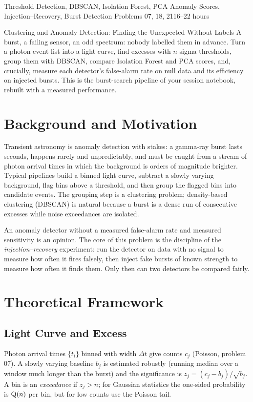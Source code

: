 \documentclass[11pt,a4paper]{article}
\begin{document}
%
{Threshold Detection, DBSCAN, Isolation Forest, PCA Anomaly Scores, Injection--Recovery, Burst Detection}%
{Problems 07, 18, 21}{16--22 hours}

\begin{summarybox}{Clustering and Anomaly Detection: Finding the Unexpected Without Labels}
A burst, a failing sensor, an odd spectrum: nobody labelled them in advance. Turn a photon event list into a light curve, find excesses with $n$-sigma thresholds, group them with DBSCAN, compare Isolation Forest and PCA scores, and, crucially, measure each detector's false-alarm rate on null data and its efficiency on injected bursts. This is the burst-search pipeline of your session notebook, rebuilt with a measured performance.
\end{summarybox}


\section*{Background and Motivation}
Transient astronomy is anomaly detection with stakes: a gamma-ray burst lasts seconds, happens rarely and unpredictably, and must be caught from a stream of photon arrival times in which the background is orders of magnitude brighter. Typical pipelines build a binned light curve, subtract a slowly varying background, flag bins above a threshold, and then group the flagged bins into candidate events. The grouping step is a clustering problem; density-based clustering (DBSCAN) is natural because a burst is a dense run of consecutive excesses while noise exceedances are isolated.

An anomaly detector without a measured false-alarm rate and measured sensitivity is an opinion. The core of this problem is the discipline of the \emph{injection--recovery} experiment: run the detector on data with no signal to measure how often it fires falsely, then inject fake bursts of known strength to measure how often it finds them. Only then can two detectors be compared fairly.

\section*{Theoretical Framework}
\subsection{Light Curve and Excess}
Photon arrival times $\{t_i\}$ binned with width $\Delta t$ give counts $c_j$ (Poisson, problem 07). A slowly varying baseline $b_j$ is estimated robustly (running median over a window much longer than the burst) and the significance is $z_j=(c_j-b_j)/\sqrt{b_j}$. A bin is an \emph{exceedance} if $z_j>n$; for Gaussian statistics the one-sided probability is $\operatorname{Q}(n)$ per bin, but for low counts use the Poisson tail.
\end{document}

